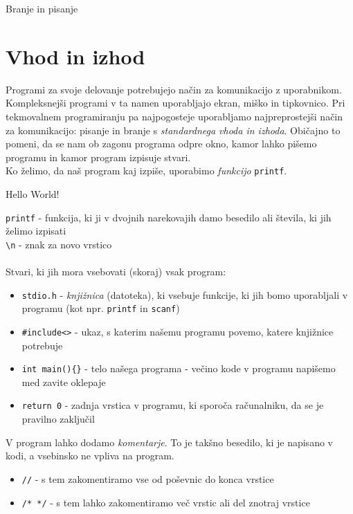 
Branje in pisanje

\section{Vhod in izhod}
Programi za svoje delovanje potrebujejo način za komunikacijo z
uporabnikom. Kompleksnejši programi v ta namen uporabljajo ekran, miško
in tipkovnico. Pri tekmovalnem programiranju pa najpogosteje uporabljamo najpreprostejši način za komunikacijo: pisanje in branje s \emph{standardnega vhoda in izhoda}. Običajno to pomeni, da se nam ob zagonu programa odpre okno, kamor lahko pišemo programu in kamor program izpisuje stvari.\\
Ko želimo, da naš program kaj izpiše, uporabimo \emph{funkcijo} \verb+printf+.
\begin{examples}


\begin{inout}
\tcblower
Hello World!
\end{inout}

\end{examples}

\verb+printf+ - funkcija, ki ji v dvojnih narekovajih damo besedilo ali števila, ki jih želimo izpisati\\
\verb+\n+ - znak za novo vrstico
\\\\
Stvari, ki jih mora vsebovati (skoraj) vsak program:
\begin{itemize}
	\item \verb+stdio.h+ - \emph{knjižnica} (datoteka), ki vsebuje funkcije, ki jih bomo uporabljali v programu (kot npr. \verb+printf+ in \verb+scanf+)
	\item \verb+#include<>+ - ukaz, s katerim našemu programu povemo, katere knjižnice potrebuje
	\item \verb+int main(){}+ - telo našega programa - večino kode v programu napišemo med zavite oklepaje
	\item \verb+return 0+ - zadnja vrstica v programu, ki sporoča računalniku, da se je pravilno zaključil
\end{itemize}

\noindent V program lahko dodamo \emph{komentarje}. To je takšno besedilo, ki je napisano v kodi, a vsebinsko ne vpliva na program.
\begin{itemize}
	\item \verb+//+ - s tem zakomentiramo vse od poševnic do konca vrstice
	\item \verb+/* */+ - s tem lahko zakomentiramo več vrstic ali del znotraj vrstice
\end{itemize}

